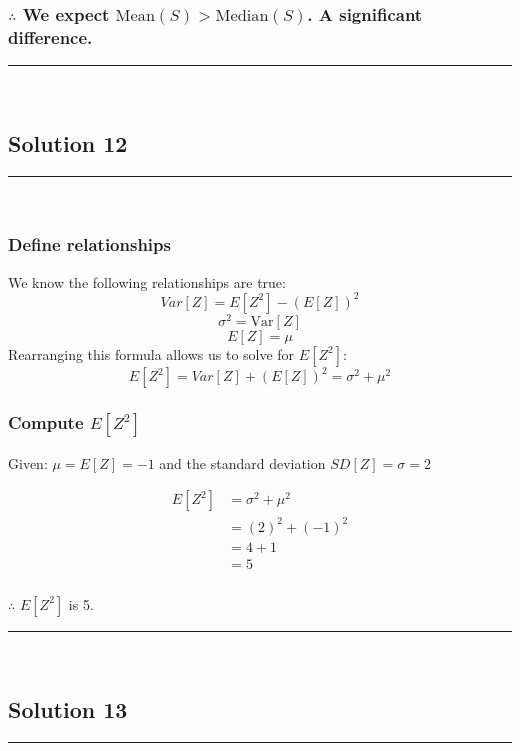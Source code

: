 \documentclass{article}
\begin{document}
\subsubsection*{\normalfont $\therefore$ We expect $\text{Mean}(S) > \text{Median}(S)$. A significant difference.}


\noindent\rule{\textwidth}{0.4pt}\\

\newpage
\subsection*{Solution 12}
\noindent\rule{\textwidth}{0.4pt}\\
\subsubsection*{Define relationships}

\parbox{\textwidth}{
We know the following relationships are true:
$$ Var[Z] = E[Z^2] - (E[Z])^2$$
$$\sigma^{2} = \text{Var}[Z]$$ 
$$E[Z] = \mu$$
Rearranging this formula allows us to solve for $E[Z^2]$:
$$ E[Z^2] = Var[Z] + (E[Z])^2 = \sigma^2 + \mu^2 $$

}
\subsubsection*{Compute $E[Z^{2}]$}
\parbox{\textwidth}{
Given: $\mu = E[Z] = -1$ and the standard deviation $SD[Z] = \sigma = 2$
}
\begin{align*}
E[Z^2] &= \sigma^2 + \mu^2 \\
&= (2)^2 + (-1)^2 \\
&= 4 + 1 \\
&= 5
\end{align*}

\subsubsection*{\normalfont}{$\therefore$ $E[Z^2]$ is 5.}

\noindent\rule{\textwidth}{0.4pt}\\

\newpage

\subsection*{Solution 13}
\noindent\rule{\textwidth}{0.4pt}\\
\end{document}

